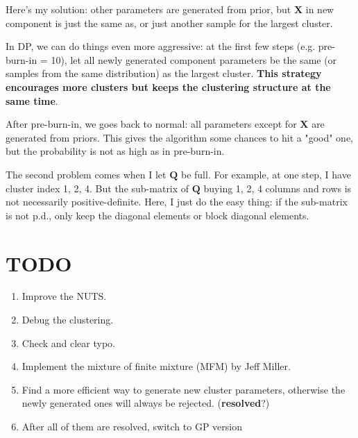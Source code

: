 \documentclass[]{article}
\begin{document}
Here's my solution: other parameters are generated from prior, but $\bm{X}$ in new component is just the same  as, or just another sample for the largest cluster. 

In DP, we can do things even more aggressive: at the first few steps (e.g. pre-burn-in = 10), let all newly generated component parameters be the same (or samples from the same distribution) as the largest cluster. \textbf{This strategy encourages more clusters but keeps the clustering structure at the same time}.  

After pre-burn-in, we goes back to normal: all parameters except for $\bm{X}$ are generated from priors. This gives the algorithm some chances to hit a "good" one, but the probability is not as high as in pre-burn-in.

The second problem comes when I let $\bm{Q}$ be full. For example, at one step, I have cluster index 1, 2, 4. But the sub-matrix of $\bm{Q}$ buying 1, 2, 4 columns and rows is not necessarily positive-definite. Here, I just do the easy thing: if the sub-matrix is not p.d., only keep the diagonal elements or block diagonal elements.











\clearpage


\section{TODO}
\begin{enumerate}
	\def\labelenumi{(\arabic{enumi})}
	\item
	Improve the NUTS.
	\item
	Debug the clustering.
	\item
	Check and clear typo.
	\item
	Implement the mixture of finite mixture (MFM) by Jeff Miller.
	\item
	Find a more efficient way to generate new cluster parameters, otherwise the newly generated ones will always be rejected. (\textbf{resolved}?)
	\item
	After all of them are resolved, switch to GP version
	
\end{enumerate}
\end{document}
